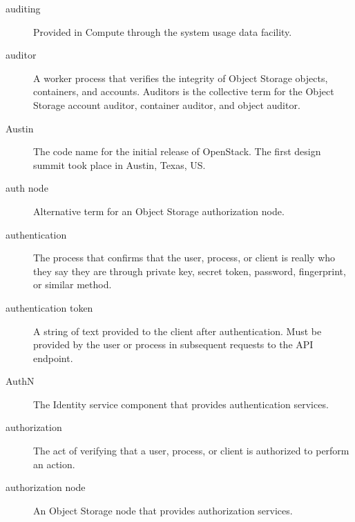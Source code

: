 \documentclass[letterpaper,10pt,english]{sphinxmanual}
\begin{document}
\begin{description}
\item[{auditing}] \leavevmode{}\label{_source/glossary:term-auditing}
Provided in Compute through the system usage data
facility.

\item[{auditor}] \leavevmode{}\label{_source/glossary:term-auditor}
A worker process that verifies the integrity of Object Storage
objects, containers, and accounts. Auditors is the collective term for
the Object Storage account auditor, container auditor, and object
auditor.

\item[{Austin}] \leavevmode{}\label{_source/glossary:term-austin}
The code name for the initial release of
OpenStack. The first design summit took place in
Austin, Texas, US.

\item[{auth node}] \leavevmode{}\label{_source/glossary:term-auth-node}
Alternative term for an Object Storage authorization
node.

\item[{authentication}] \leavevmode{}\label{_source/glossary:term-authentication}
The process that confirms that the user, process, or client is
really who they say they are through private key, secret token,
password, fingerprint, or similar method.

\item[{authentication token}] \leavevmode{}\label{_source/glossary:term-authentication-token}
A string of text provided to the client after authentication.
Must be provided by the user or process in subsequent requests to the
API endpoint.

\item[{AuthN}] \leavevmode{}\label{_source/glossary:term-authn}
The Identity service component that provides authentication
services.

\item[{authorization}] \leavevmode{}\label{_source/glossary:term-authorization}
The act of verifying that a user, process, or client is
authorized to perform an action.

\item[{authorization node}] \leavevmode{}\label{_source/glossary:term-authorization-node}
An Object Storage node that provides authorization
services.


\end{description}
\end{document}
